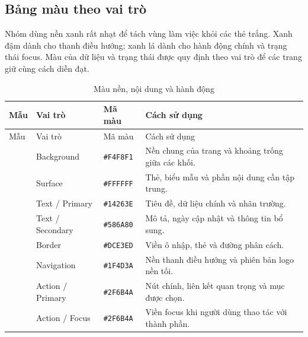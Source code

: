 \subsection{Bảng màu theo vai trò}
Nhóm dùng nền xanh rất nhạt để tách vùng làm việc khỏi các thẻ trắng. Xanh đậm dành cho thanh điều hướng; xanh lá dành cho hành động chính và trạng thái focus. Màu của dữ liệu và trạng thái được quy định theo vai trò để các trang giữ cùng cách diễn đạt.
\begin{smalltable}\begin{longtable}{L{1.2cm}L{3.5cm}L{2.6cm}L{7cm}}
\caption{Màu nền, nội dung và hành động}\label{tab:design-tokens}\\\toprule Mẫu & Vai trò & Mã màu & Cách sử dụng\\\midrule\endfirsthead
\toprule Mẫu & Vai trò & Mã màu & Cách sử dụng\\\midrule\endhead
{} & Background & \texttt{\#F4F8F1} & Nền chung của trang và khoảng trống giữa các khối.\\
 & Surface & \texttt{\#FFFFFF} & Thẻ, biểu mẫu và phần nội dung cần tập trung.\\
 & Text / Primary & \texttt{\#14263E} & Tiêu đề, dữ liệu chính và nhãn trường.\\
 & Text / Secondary & \texttt{\#586A80} & Mô tả, ngày cập nhật và thông tin bổ sung.\\
 & Border & \texttt{\#DCE3ED} & Viền ô nhập, thẻ và đường phân cách.\\
 & Navigation & \texttt{\#1F4D3A} & Nền thanh điều hướng và phiên bản logo nền tối.\\
 & Action / Primary & \texttt{\#2F6B4A} & Nút chính, liên kết quan trọng và mục được chọn.\\
 & Action / Focus & \texttt{\#2F6B4A} & Viền focus khi người dùng thao tác với thành phần.\\\bottomrule
\end{longtable}\end{smalltable}

